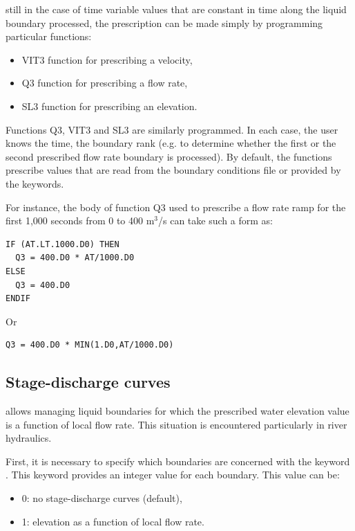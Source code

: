 still in the case of time variable values that are constant in time along the
liquid boundary processed, the prescription can be made simply by programming
particular functions:

\begin{itemize}
\item VIT3 function for prescribing a velocity,

\item Q3 function for prescribing a flow rate,

\item SL3 function for prescribing an elevation.
\end{itemize}

Functions Q3, VIT3 and SL3 are similarly programmed. In each case, the user
knows the time, the boundary rank (e.g. to determine whether the first or the
second prescribed flow rate boundary is processed). By default, the functions
prescribe values that are read from the boundary conditions file or provided by
the keywords.

For instance, the body of function Q3 used to prescribe a flow rate ramp for
the first 1,000 seconds from 0 to 400 m${}^{3}$/s can take such a form as:

\begin{lstlisting}[language=TelFortran]
IF (AT.LT.1000.D0) THEN
  Q3 = 400.D0 * AT/1000.D0
ELSE
  Q3 = 400.D0
ENDIF
\end{lstlisting}

Or

\begin{lstlisting}[language=TelFortran]
Q3 = 400.D0 * MIN(1.D0,AT/1000.D0)
\end{lstlisting}

\subsection{Stage-discharge curves}
\label{sec:discharge}
 allows managing liquid boundaries for which the prescribed water
elevation value is a function of local flow rate. This situation is encountered
particularly in river hydraulics.

First, it is necessary to specify which boundaries are concerned with the
keyword . This keyword provides an integer value
for each boundary. This value can be:

\begin{itemize}
\item 0: no stage-discharge curves (default),

\item 1: elevation as a function of local flow rate.
\end{itemize}

